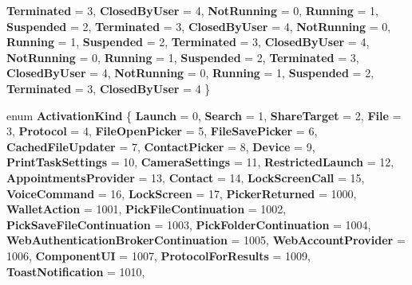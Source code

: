 \begin{DoxyCompactItemize}
{\bfseries Terminated} = 3, 
\newline
{\bfseries Closed\+By\+User} = 4, 
{\bfseries Not\+Running} = 0, 
{\bfseries Running} = 1, 
{\bfseries Suspended} = 2, 
\newline
{\bfseries Terminated} = 3, 
{\bfseries Closed\+By\+User} = 4, 
{\bfseries Not\+Running} = 0, 
{\bfseries Running} = 1, 
\newline
{\bfseries Suspended} = 2, 
{\bfseries Terminated} = 3, 
{\bfseries Closed\+By\+User} = 4, 
{\bfseries Not\+Running} = 0, 
\newline
{\bfseries Running} = 1, 
{\bfseries Suspended} = 2, 
{\bfseries Terminated} = 3, 
{\bfseries Closed\+By\+User} = 4, 
\newline
{\bfseries Not\+Running} = 0, 
{\bfseries Running} = 1, 
{\bfseries Suspended} = 2, 
{\bfseries Terminated} = 3, 
\newline
{\bfseries Closed\+By\+User} = 4
 \}
\item 
\mbox{\label{namespace_windows_1_1_application_model_1_1_activation_a21aa80ed65cf8b4f5d0d6c3b39f65284}} 
enum {\bfseries Activation\+Kind} \{ \newline
{\bfseries Launch} = 0, 
{\bfseries Search} = 1, 
{\bfseries Share\+Target} = 2, 
{\bfseries File} = 3, 
\newline
{\bfseries Protocol} = 4, 
{\bfseries File\+Open\+Picker} = 5, 
{\bfseries File\+Save\+Picker} = 6, 
{\bfseries Cached\+File\+Updater} = 7, 
\newline
{\bfseries Contact\+Picker} = 8, 
{\bfseries Device} = 9, 
{\bfseries Print\+Task\+Settings} = 10, 
{\bfseries Camera\+Settings} = 11, 
\newline
{\bfseries Restricted\+Launch} = 12, 
{\bfseries Appointments\+Provider} = 13, 
{\bfseries Contact} = 14, 
{\bfseries Lock\+Screen\+Call} = 15, 
\newline
{\bfseries Voice\+Command} = 16, 
{\bfseries Lock\+Screen} = 17, 
{\bfseries Picker\+Returned} = 1000, 
{\bfseries Wallet\+Action} = 1001, 
\newline
{\bfseries Pick\+File\+Continuation} = 1002, 
{\bfseries Pick\+Save\+File\+Continuation} = 1003, 
{\bfseries Pick\+Folder\+Continuation} = 1004, 
{\bfseries Web\+Authentication\+Broker\+Continuation} = 1005, 
\newline
{\bfseries Web\+Account\+Provider} = 1006, 
{\bfseries Component\+UI} = 1007, 
{\bfseries Protocol\+For\+Results} = 1009, 
{\bfseries Toast\+Notification} = 1010, 

\end{DoxyCompactItemize}
